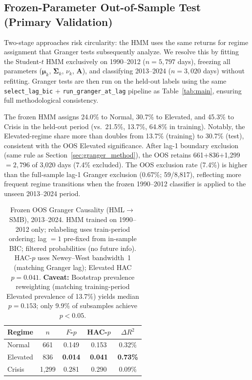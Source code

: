\documentclass[sigconf,anonymous]{acmart}
\begin{document}
\subsection{Frozen-Parameter Out-of-Sample Test (Primary Validation)}
\label{sec:frozen_oos}

Two-stage approaches risk circularity: the HMM uses the same returns for
regime assignment that Granger tests subsequently analyze.
We resolve this by fitting the Student-$t$ HMM exclusively on 1990--2012
($n = 5{,}797$ days), freezing all parameters
($\boldsymbol{\mu}_k$, $\boldsymbol{\Sigma}_k$, $\nu_k$, $\mathbf{A}$),
and classifying 2013--2024 ($n = 3{,}020$ days) without refitting.
Granger tests are then run on the held-out labels using the same
\texttt{select\_lag\_bic} + \texttt{run\_granger\_at\_lag} pipeline as Table~\ref{tab:main},
ensuring full methodological consistency.

The frozen HMM assigns 24.0\% to Normal, 30.7\% to Elevated, and 45.3\%
to Crisis in the held-out period (vs.\ 21.5\%, 13.7\%, 64.8\% in training).
Notably, the Elevated-regime share more than doubles from 13.7\% (training)
to 30.7\% (test), consistent with the OOS Elevated significance.
After lag-1 boundary exclusion (same rule as Section~\ref{sec:granger_method}),
the OOS retains 661$+$836$+$1{,}299$=2{,}796$ of 3,020 days (7.4\% excluded).
The OOS exclusion rate (7.4\%) is higher than the full-sample lag-1 Granger exclusion
(0.67\%; 59/8,817), reflecting more frequent regime transitions when the
frozen 1990--2012 classifier is applied to the unseen 2013--2024 period.

\begin{table}[t]
\centering
\setlength{\tabcolsep}{5pt}
\caption{Frozen OOS Granger Causality (HML$\to$SMB), 2013--2024.
HMM trained on 1990--2012 only; relabeling uses train-period ordering;
lag $= 1$ pre-fixed from in-sample BIC; filtered probabilities (no future info).
HAC-$p$ uses Newey--West bandwidth~1 (matching Granger lag); Elevated HAC $p = 0.041$.
\textbf{Caveat:} Bootstrap prevalence reweighting (matching training-period Elevated prevalence
of 13.7\%) yields median $p = 0.153$; only 9.9\% of subsamples achieve $p < 0.05$.}
\label{tab:frozen_granger}
\small
\begin{tabular}{@{}lcccc@{}}
\toprule
Regime & $n$ & $F$-$p$ & HAC-$p$ & $\Delta R^2$ \\
\midrule
Normal    & 661 & 0.149 & 0.153 & 0.32\% \\
Elevated  & 836 & \textbf{0.014} & \textbf{0.041} & \textbf{0.73\%} \\
Crisis    & 1,299 & 0.281 & 0.290 & 0.09\% \\
\bottomrule
\end{tabular}
\end{table}
\end{document}
